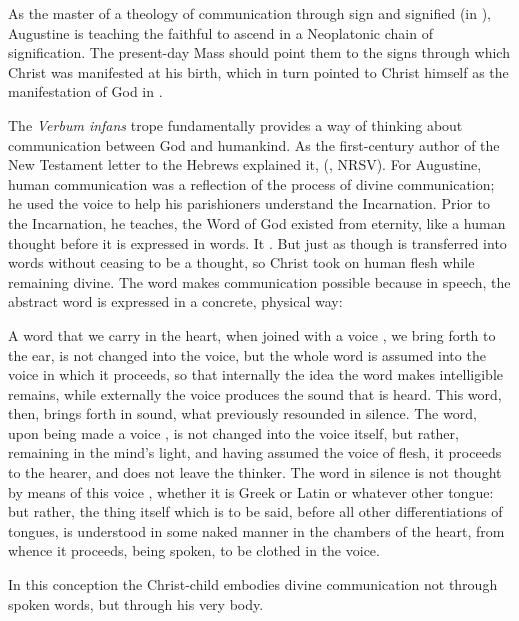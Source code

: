 As the master of a theology of communication through sign and signified (in
), Augustine is teaching the faithful to ascend in
a Neoplatonic chain of signification.
The present-day Mass should point them to the signs through which Christ was
manifested at his birth, which in turn pointed to Christ himself as the
manifestation of God in .

The \emph{Verbum infans} trope fundamentally provides a way of thinking about
communication between God and humankind.
As the first-century author of the New Testament letter to the Hebrews explained
it,  (,
NRSV). 
For Augustine, human communication was a reflection of the process of divine
communication; he used the voice to help his parishioners understand the
Incarnation.
Prior to the Incarnation, he teaches, the Word of God existed from eternity,
like a human thought before it is expressed in words.
It .%
    \Autocite[1001, Sermo 187, In Natali Domini 4]{Augustine:SermonesPL}
But just as though is transferred into words without ceasing to be a thought,
so Christ took on human flesh while remaining divine.
The word makes communication possible because in speech, the abstract word is
expressed in a concrete, physical way:
\begin{quoting}
    A word  that we carry in the heart, when
    joined with a voice , we bring
    forth to the ear, is not changed into the voice, but the whole word is
    assumed into the voice in which it proceeds, so that internally the idea the
    word makes intelligible remains, while externally the voice produces the
    sound that is heard.
    This word, then, brings forth in sound, what previously resounded in
    silence.  The word, upon being made a voice , is
    not changed into the voice itself, but rather, remaining in the mind's
    light, and having assumed the voice  of flesh, it proceeds to
    the hearer, and does not leave the thinker.
    The word in silence is not thought by means of this voice ,
    whether it is Greek or Latin or whatever other tongue: but rather, the thing
    itself which is to be said, before all other differentiations of tongues, is
    understood in some naked manner in the chambers of the heart, from whence it
    proceeds, being spoken, to be clothed in the voice.%
    \Autocites
    [1002, Sermo 187, In Natali Domini 4]{Augustine:SermonesPL}
    [on Christ as , see][872--889]{Lapide:Gospels19C}
\end{quoting}
In this conception the Christ-child embodies divine communication not through
spoken words, but through his very body.

